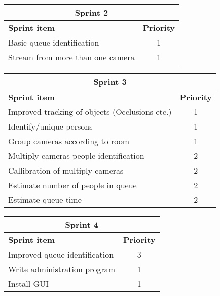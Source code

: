 \label{sprint2}
\begin{center}
	\begin{Large}
	\begin{tabular}{|p{10.5cm}|c|}
		\hline
		\multicolumn{2}{|c|}{\textbf{Sprint 2}} \\
		\hline
		\large{\textbf{Sprint item}} & \large{\textbf{Priority}} \\
		\hline
		\large{Basic queue identification} & \large{1} \\
		\hline
		\large{Stream from more than one camera} & \large{1} \\
		\hline
	\end{tabular}
	\end{Large}
\end{center}



\label{sprint3}
\begin{center}
	\begin{Large}
	\begin{tabular}{|p{10.5cm}|c|}
		\hline
		\multicolumn{2}{|c|}{\textbf{Sprint 3}} \\
		\hline
		\large{\textbf{Sprint item}} & \large{\textbf{Priority}} \\
		\hline
		\large{Improved tracking of objects (Occlusions etc.)} & \large{1} \\
		\hline	
		\large{Identify/unique persons} & \large{1} \\
		\hline	
		\large{Group cameras according to room} & \large{1} \\
		\hline
		\large{Multiply cameras people identification} & \large{2} \\
		\hline
		\large{Callibration of multiply cameras} & \large{2} \\
		\hline
		\large{Estimate number of people in queue} & \large{2} \\
		\hline
		\large{Estimate queue time} & \large{2} \\
		\hline
	\end{tabular}
	\end{Large}
\end{center}



\label{sprint4}
\begin{center}
	\begin{Large}
	\begin{tabular}{|p{10.5cm}|c|}
		\hline
		\multicolumn{2}{|c|}{\textbf{Sprint 4}} \\
		\hline
		\large{\textbf{Sprint item}} & \large{\textbf{Priority}} \\
		\hline
		\large{Improved queue identification} & \large{3} \\
		\hline
		\large{Write administration program} & \large{1} \\
		\hline
		\large{Install GUI} & \large{1} \\
		\hline
	\end{tabular}
	\end{Large}
\end{center}



